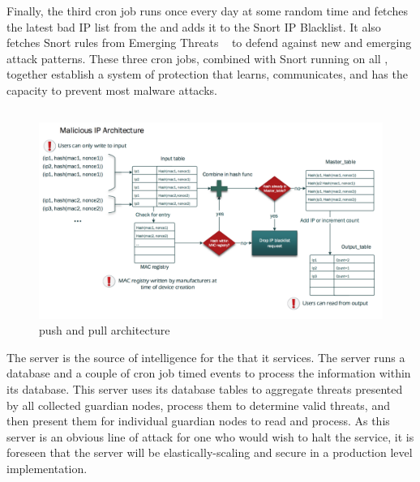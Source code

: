 Finally, the third cron job runs once every day at some random time and fetches the latest bad IP list from the \servname and adds it to the Snort IP Blacklist. It also fetches Snort rules from Emerging Threats ~\cite{emerging} to defend against new and emerging attack patterns. These three cron jobs, combined with Snort running on all \nodenames, together establish a system of protection that learns, communicates, and has the capacity to prevent most malware attacks.

\subsection{\servname}
\label{sec:design:server}

\begin{figure}
    \centering
    \includegraphics[width=0.95\linewidth]{figs/blacklistserver.png}
    \caption{\servname push and pull architecture}
    \label{fig:blacklistserver}
\end{figure}

The \servname server is the source of intelligence for the \nodenames that it services. The server runs a database and a couple of cron job timed events to process the information within its database. This server uses its database tables to aggregate threats presented by all collected guardian nodes, process them to determine valid threats, and then present them for individual guardian nodes to read and process. As this server is an obvious line of attack for one who would wish to halt the \sysname service, it is foreseen that the server will be elastically-scaling and secure in a production level implementation. 

